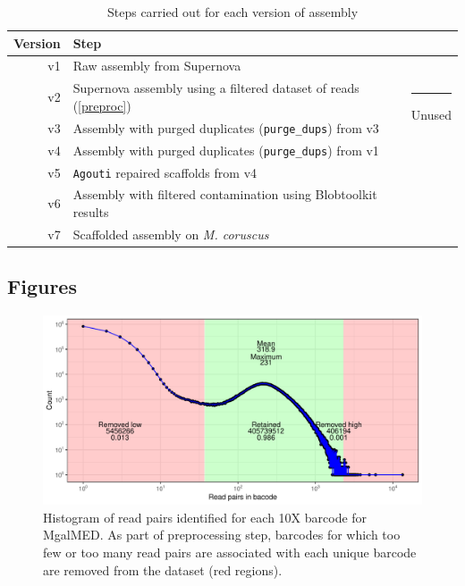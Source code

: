 \documentclass[11pt, a4paper]{article}
\begin{document}
\begin{table}[h]
	\caption{Steps carried out for each version of assembly}
	\label{suptab:versions}
	\begin{tabular}{rll}
		Version & Step & \\ \toprule
		\rowcolor{gray!20}
		v1 & Raw assembly from Supernova & \\
		v2 & Supernova assembly using a filtered dataset of reads (\cref{preproc}) & \multirow{2}{*}{\rule{1pt}{25pt} Unused} \\
		v3 & Assembly with purged duplicates (\texttt{purge\_dups}) from v3 & \\
		\rowcolor{gray!20}
		v4 & Assembly with purged duplicates (\texttt{purge\_dups}) from v1 & \\
		\rowcolor{gray!20}
		v5 & \texttt{Agouti} repaired scaffolds from v4 & \\
		\rowcolor{gray!20}
		v6 & Assembly with filtered contamination using Blobtoolkit results & \\
		\rowcolor{gray!20}
		v7 & Scaffolded assembly on \textit{M. coruscus} & \\ \bottomrule
	\end{tabular}
\end{table}
\vspace{3em}

\subsection*{Figures}
\begin{figure}[h]
	\includegraphics[width=\linewidth]{figures/MgalMED_preproc_barcode_filt.pdf}
	\caption{Histogram of read pairs identified for each 10X barcode for MgalMED.
		As part of preprocessing step, barcodes for which too few or too many read pairs are associated with each unique barcode are removed from the dataset (red regions).}
	\label{supfig:preproc_MgalMED}
\end{figure}
\end{document}
